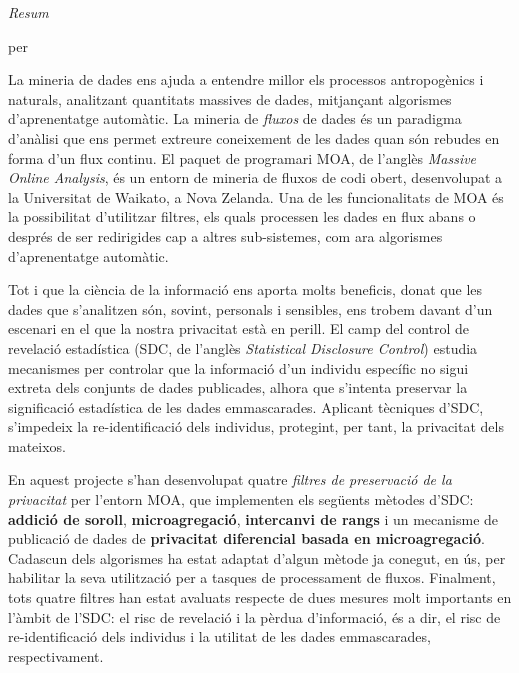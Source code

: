 \clearpage %

\thispagestyle{plain}
\null\vfil
\begin{center}
	\setlength{\parskip}{0pt}
	{\huge{\textit{Resum}} \par}
	\bigskip
	{\Large\bf \ttitle \par} %
	\medskip
	{\normalsize per \authornames \par} %
\end{center}

La mineria de dades ens ajuda a entendre millor els processos antropogènics i naturals, analitzant quantitats massives de dades, mitjançant algorismes d'aprenentatge automàtic. La mineria de \textit{fluxos} de dades és un paradigma d'anàlisi que ens permet extreure coneixement de les dades quan són rebudes en forma d'un flux continu. El paquet de programari MOA, de l'anglès \textit{Massive Online Analysis}, és un entorn de mineria de fluxos de codi obert, desenvolupat a la Universitat de Waikato, a Nova Zelanda. Una de les funcionalitats de MOA és la possibilitat d'utilitzar filtres, els quals processen les dades en flux abans o després de ser redirigides cap a altres sub-sistemes, com ara algorismes d'aprenentatge automàtic.

Tot i que la ciència de la informació ens aporta molts beneficis, donat que les dades que s'analitzen són, sovint, personals i sensibles, ens trobem davant d'un escenari en el que la nostra privacitat està en perill. El camp del control de revelació estadística (SDC, de l'anglès \textit{Statistical Disclosure Control}) estudia mecanismes per controlar que la informació d'un individu específic no sigui extreta dels conjunts de dades publicades, alhora que s'intenta preservar la significació estadística de les dades emmascarades. Aplicant tècniques d'SDC, s'impedeix la re-identificació dels individus, protegint, per tant, la privacitat dels mateixos.

En aquest projecte s'han desenvolupat quatre \textit{filtres de preservació de la privacitat} per l'entorn MOA, que implementen els següents mètodes d'SDC: \textbf{addició de soroll}, \textbf{microagregació}, \textbf{intercanvi de rangs} i un mecanisme de publicació de dades de \textbf{privacitat diferencial basada en microagregació}. Cadascun dels algorismes ha estat adaptat d'algun mètode ja conegut, en ús, per habilitar la seva utilització per a tasques de processament de fluxos. Finalment, tots quatre filtres han estat avaluats respecte de dues mesures molt importants en l'àmbit de l'SDC: el risc de revelació i la pèrdua d'informació, és a dir, el risc de re-identificació dels individus i la utilitat de les dades emmascarades, respectivament.

